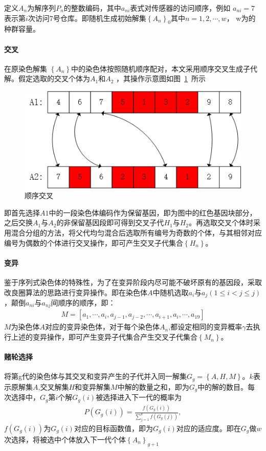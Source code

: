 \documentclass{whutmod}
\begin{document}
		定义$A_n$为解序列$P_{n}$的整数编码，其中$a_{ni}$表式对传感器的访问顺序，例如 $a_{ni}=7$表示第$i$次访问7号仓库。即随机生成初始解集$\left \{A_n\right \}_0$其中$n=1,2,\cdots,w$， w为的种群容量。
		
		\paragraph{交叉}
		在原染色解集 $\left \{ A_n \right \}$中的染色体按照随机顺序配对，本文采用顺序交叉生成子代解。假定选取的交叉个体为$A_1$和$A_2$    ，其操作示意图如图~\ref{gbf}~所示
		\begin{figure}[H]
			\centering
			\includegraphics[width=\textwidth]{figures/cross.png}
			\caption{顺序交叉}\label{gbf}
		\end{figure}
		
		即首先选择$A1$中的一段染色体编码作为保留基因，即为图中的红色基因块部分，之后交换$A_1$与$A_2$的非保留基因段即可得到交叉子代$H_1$与$H_2$。再选取交叉个体时采用混合分组的方法，将父代均匀混合后选取所有编号为奇数的个体，与其相邻对应编号为偶数的个体进行交叉操作，即可产生交叉子代集合$\left \{ H_n \right \}$。
	     
		
		
		\paragraph{变异}
		鉴于序列式染色体的特殊性，为了在变异阶段内尽可能不破坏原有的基因段，采取改良圈算法的思路进行变异操作。即在染色体$A$中随机选取$a_{i}$与$a_{j}(1\leqslant i<j\leqslant j )$，颠倒$a_{ni}$与$a_{nj}$间顺序的顺序，即：
		\begin{gather}
		M=[a_{1},\cdots,a_{i},a_{j-1},a_{j-2},\cdots,a_{i+1},a_{i},\cdots,a_{19}]
		\end{gather}
		$M$为染色体$A$对应的变异染色体，对于每个染色体$A_n$,都设定相同的变异概率$\gamma$去执行上述的变异操作，即可产生变异子代集合产生交叉子代集合$\left \{ M_n \right \}$。 
		\paragraph{赌轮选择}
		将第g代的染色体与其交叉和变异产生的子代并入同一解集$G_g=\left \{A,H,M\right \}$。$k$表示原解集$A$,交叉解集$H$和变异解集$M$中解的数量之和，即为$G_g$中的解的数目。每次选择中，$G_g$第$i$个解$G_g(i)$被选择进入下一代的概率为
		\begin{gather}
		P(G_{g}(i))=\frac{f(G_{g}(i))}{\sum_{j=1}^{k}f(G_{g}(j))},
		\end{gather}
		$f(G_{g}(i))$为$G_{g}(i)$对应的目标函数值，即为$G_{g}(i)$对应的适应度。即在$G_g$做$w$次选择，将被选中个体放入下一代个体$\left \{A_n  \right \}_{g+1}$
\end{document}
